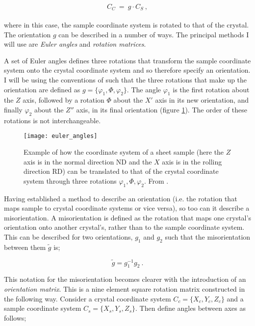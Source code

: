 \documentclass[a4paper,12pt,twoside]{report}
\numberwithin{equation}{chapter}
\begin{document}
\begin{equation}
C_C\ =\ g \cdot C_S\ ,
\end{equation}  
\\
where in this case, the sample coordinate system is rotated to that of the crystal. The orientation $g$ can be described in a number of ways. The principal methods I will use are \emph{Euler angles} and \emph{rotation matrices}.


A set of Euler angles defines three rotations that transform the sample coordinate system onto the crystal coordinate system and so therefore specify an orientation. I will be using the conventions of \cite{bunge1982texture} such that the three rotations that make up the orientation are defined as $g = \{\varphi_1,\Phi,\varphi_2\}$. The angle $\varphi_1$ is the first rotation about the $Z$ axis, followed by a rotation $\Phi$ about the $X'$ axis in its new orientation, and finally $\varphi_2$ about the $Z''$ axis, in its final orientation (figure \ref{fig:euler_angles}). The order of these rotations is not interchangeable.




\begin{figure}[h!]
  \centering
    \texttt{[image: euler\_angles]}
  \caption[Euler angle description]{Example of how the coordinate system of a sheet sample (here the $Z$ axis is in the normal direction ND and the $X$ axis is in the rolling direction RD) can be translated to that of the crystal coordinate system through three rotations $\varphi_1,\Phi,\varphi_2$. From \cite{Randle2000}.}
  \label{fig:euler_angles}
\end{figure}

Having established a method to describe an orientation (i.e. the rotation that maps sample to crystal coordinate systems or vice versa), so too can it describe a misorientation. A misorientation is defined as the rotation that maps one crystal's orientation onto another crystal's, rather than to the sample coordinate system. This can be described for two orientations, $g_1$ and $g_2$ such that the misorientation between them $\tilde{g}$ is;

\begin{equation} \label{eq:misor_matrix}
\tilde{g} = g_1^{-1}g_2\ .
\end{equation} 

This notation for the misorientation becomes clearer with the introduction of an \emph{orientation matrix}. This is a nine element square rotation matrix constructed in the following way. Consider a crystal coordinate system $C_c = \{X_c,Y_c,Z_c\}$ and a sample coordinate system $C_s = \{X_s,Y_s,Z_s\}$. Then define angles between axes as follows;
\end{document}
